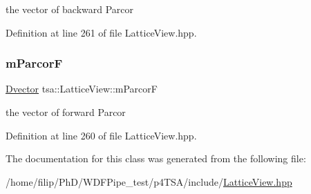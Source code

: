 the vector of backward Parcor 



Definition at line 261 of file Lattice\+View.\+hpp.

\mbox{\label{classtsa_1_1_lattice_view_a3fbd93734d9b37488687840609c93e7a}} 
\subsubsection{\texorpdfstring{m\+ParcorF}{mParcorF}}
{\footnotesize\ttfamily \hyperlink{namespacetsa_a8900fb03d849baf447a1a0efe2561fb2}{Dvector} tsa\+::\+Lattice\+View\+::m\+ParcorF\hspace{0.3cm}{\ttfamily [private]}}



the vector of forward Parcor 



Definition at line 260 of file Lattice\+View.\+hpp.



The documentation for this class was generated from the following file\+:\begin{DoxyCompactItemize}
\item 
/home/filip/\+Ph\+D/\+W\+D\+F\+Pipe\+\_\+test/p4\+T\+S\+A/include/\hyperlink{_lattice_view_8hpp}{Lattice\+View.\+hpp}\end{DoxyCompactItemize}
